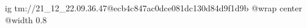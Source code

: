 
 
 
 
 

\qqSecOrig


\ifcmt
  ig tm://21_12_22.09.36.47@ecb4c847ac0dce081dc130d84d9f1d9b
  @wrap center
  @width 0.8
\fi

